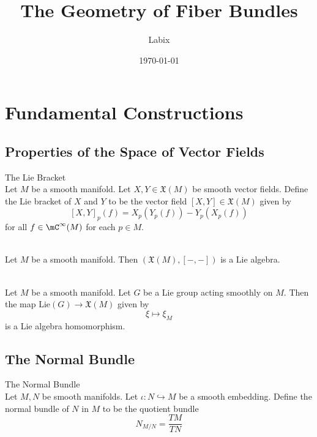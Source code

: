 \documentclass[a4paper]{article}
\title{The Geometry of Fiber Bundles}
\author{Labix}
\date{\today}
\begin{document}
\maketitle
\pagebreak
\tableofcontents
\pagebreak
\section{Fundamental Constructions}
\subsection{Properties of the Space of Vector Fields}
\begin{defn}{The Lie Bracket}{}\\
Let $M$ be a smooth manifold. Let $X,Y\in\mathfrak{X}(M)$ be smooth vector fields. Define the Lie bracket of $X$ and $Y$ to be the vector field $[X,Y]\in\mathfrak{X}(M)$ given by $$[X,Y]_p(f)=X_p(Y_p(f))-Y_p(X_p(f))$$ for all $f\in\mC^\infty(M)$ for each $p\in M$. 
\end{defn}

\begin{lmm}{}{}\\
Let $M$ be a smooth manifold. Then $(\mathfrak{X}(M),[-,-])$ is a Lie algebra. 
\end{lmm}

\begin{prp}{}{}\\
Let $M$ be a smooth manifold. Let $G$ be a Lie group acting smoothly on $M$. Then the map $\text{Lie}(G)\to\mathfrak{X}(M)$ given by $$\xi\mapsto\xi_M$$ is a Lie algebra homomorphism.  
\end{prp}

\subsection{The Normal Bundle}
\begin{defn}{The Normal Bundle}{}\\
Let $M,N$ be smooth manifolds. Let $\iota:N\hookrightarrow M$ be a smooth embedding. Define the normal bundle of $N$ in $M$ to be the quotient bundle $$N_{M/N}=\frac{TM}{TN}$$
\end{defn}
\end{document}
